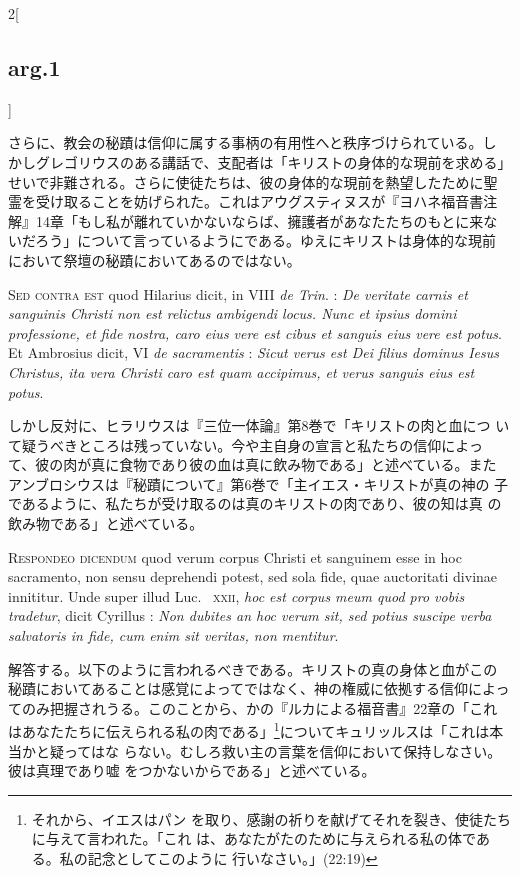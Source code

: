 \documentclass[paper=a4paper,fontsize=10pt,jafontsize=9pt,titlepage]{jlreq}
\begin{document}
\begin{paracol}{2}[\subsection{arg.1}]
\switchcolumn

さらに、教会の秘蹟は信仰に属する事柄の有用性へと秩序づけられている。し
かしグレゴリウスのある講話で、支配者は「キリストの身体的な現前を求める」
せいで非難される。さらに使徒たちは、彼の身体的な現前を熱望したために聖
霊を受け取ることを妨げられた。これはアウグスティヌスが『ヨハネ福音書注
解』14章「もし私が離れていかないならば、擁護者があなたたちのもとに来な
いだろう」について言っているようにである。ゆえにキリストは身体的な現前
において祭壇の秘蹟においてあるのではない。

\switchcolumn*[\subsection{s.c.}]

{\scshape Sed contra est} quod Hilarius dicit, in VIII {\itshape de
Trin}. : {\itshape De veritate carnis et sanguinis Christi non est
relictus ambigendi locus. Nunc et ipsius domini professione, et fide
nostra, caro eius vere est cibus et sanguis eius vere est potus}. Et
Ambrosius dicit, VI {\itshape de sacramentis} : {\itshape Sicut verus
est Dei filius dominus Iesus Christus, ita vera Christi caro est quam
accipimus, et verus sanguis eius est potus}.

\switchcolumn

しかし反対に、ヒラリウスは『三位一体論』第8巻で「キリストの肉と血につ
いて疑うべきところは残っていない。今や主自身の宣言と私たちの信仰によっ
て、彼の肉が真に食物であり彼の血は真に飲み物である」と述べている。また
アンブロシウスは『秘蹟について』第6巻で「主イエス・キリストが真の神の
子であるように、私たちが受け取るのは真のキリストの肉であり、彼の知は真
の飲み物である」と述べている。


{\scshape Respondeo dicendum} quod verum corpus Christi et sanguinem
esse in hoc sacramento, non sensu deprehendi potest, sed sola fide,
quae auctoritati divinae innititur. Unde super illud Luc.~{\scshape
xxii}, {\itshape hoc est corpus meum quod pro vobis tradetur}, dicit
Cyrillus : {\itshape Non dubites an hoc verum sit, sed potius suscipe
verba salvatoris in fide, cum enim sit veritas, non mentitur}.

\switchcolumn

解答する。以下のように言われるべきである。キリストの真の身体と血がこの
秘蹟においてあることは感覚によってではなく、神の権威に依拠する信仰によっ
てのみ把握されうる。このことから、かの『ルカによる福音書』22章の「これ
はあなたたちに伝えられる私の肉である」\footnote{それから、イエスはパン
を取り、感謝の祈りを献げてそれを裂き、使徒たちに与えて言われた。「これ
は、あなたがたのために与えられる私の体である。私の記念としてこのように
行いなさい。」(22:19)}についてキュリッルスは「これは本当かと疑ってはな
らない。むしろ救い主の言葉を信仰において保持しなさい。彼は真理であり嘘
をつかないからである」と述べている。


\end{paracol}
\end{document}
